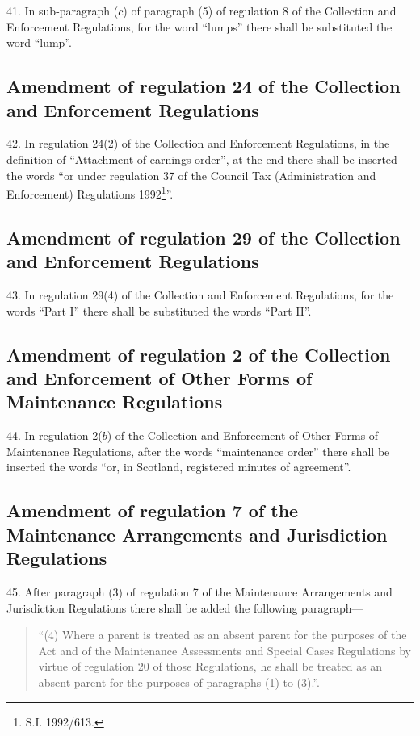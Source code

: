 \documentclass[12pt,a4paper]{article}
\begin{document}
41.  In sub-paragraph ($c$) of paragraph (5) of regulation 8 of the Collection and Enforcement Regulations, for the word “lumps” there shall be substituted the word “lump”.

\subsection[42. Amendment of regulation 24 of the Collection and Enforcement Regulations]{Amendment of regulation 24 of the Collection and Enforcement Regulations}

42.  In regulation 24(2) of the Collection and Enforcement Regulations, in the definition of “Attachment of earnings order”, at the end there shall be inserted the words “or under regulation 37 of the Council Tax (Administration and Enforcement) Regulations 1992\footnote{\frenchspacing  S.I. 1992/613.}”.

\subsection[43. Amendment of regulation 29 of the Collection and Enforcement Regulations]{Amendment of regulation 29 of the Collection and Enforcement Regulations}

43.  In regulation 29(4) of the Collection and Enforcement Regulations, for the words “Part I” there shall be substituted the words “Part II”.

\subsection[44. Amendment of regulation 2 of the Collection and Enforcement of Other Forms of Maintenance Regulations]{Amendment of regulation 2 of the Collection and Enforcement of Other Forms of Maintenance Regulations}

44.  In regulation 2($b$) of the Collection and Enforcement of Other Forms of Maintenance Regulations, after the words “maintenance order” there shall be inserted the words “or, in Scotland, registered minutes of agreement”.

\subsection[45. Amendment of regulation 7 of the Maintenance Arrangements and Jurisdiction Regulations]{Amendment of regulation 7 of the Maintenance Arrangements and Jurisdiction Regulations}

45.  After paragraph (3) of regulation 7 of the Maintenance Arrangements and Jurisdiction Regulations there shall be added the following paragraph---
\begin{quotation}
“(4) Where a parent is treated as an absent parent for the purposes of the Act and of the Maintenance Assessments and Special Cases Regulations by virtue of regulation 20 of those Regulations, he shall be treated as an absent parent for the purposes of paragraphs (1) to (3).”.
\end{quotation}
\end{document}
